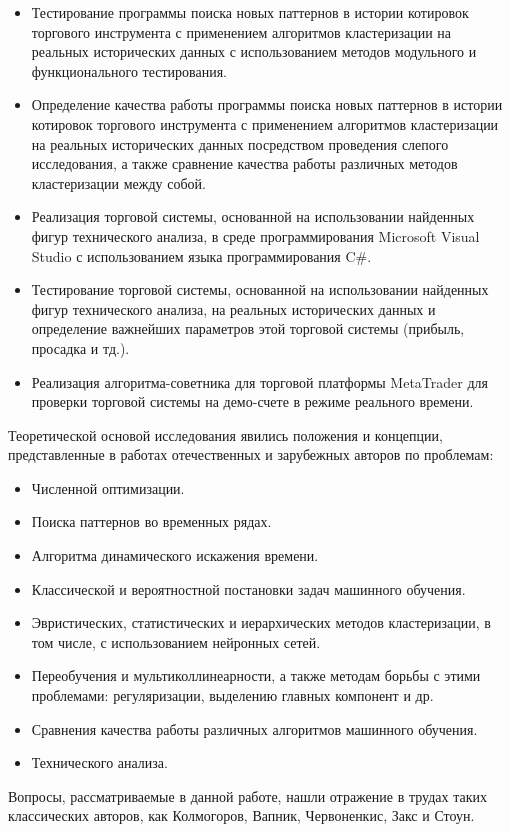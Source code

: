 \documentclass[12pt]{article}
\begin{document}
\begin{itemize}
\item Тестирование программы поиска новых паттернов в истории котировок торгового инструмента с применением алгоритмов кластеризации на реальных исторических данных с использованием методов модульного и функционального тестирования.
\item Определение качества работы программы поиска новых паттернов в истории котировок торгового инструмента с применением алгоритмов кластеризации на реальных исторических данных посредством проведения слепого исследования, а также сравнение качества работы различных методов кластеризации между собой.
\item Реализация торговой системы, основанной на использовании найденных фигур технического анализа, в среде программирования Microsoft Visual Studio с использованием языка программирования C\#.
\item Тестирование торговой системы, основанной на использовании найденных фигур технического анализа, на реальных исторических данных и определение важнейших параметров этой торговой системы (прибыль, просадка и тд.).
\item Реализация алгоритма-советника для торговой платформы MetaTrader для проверки
торговой системы на демо-счете в режиме реального времени.
\end{itemize}

Теоретической основой исследования явились положения и концепции, представленные в
работах отечественных и зарубежных авторов по проблемам:

\begin{itemize}
\item Численной оптимизации.
\item Поиска паттернов во временных рядах.
\item Алгоритма динамического искажения времени.
\item Классической и вероятностной постановки задач машинного обучения.
\item Эвристических, статистических и иерархических методов кластеризации, в том числе, с использованием нейронных сетей.
\item Переобучения и мультиколлинеарности, а также методам борьбы с этими проблемами:
регуляризации, выделению главных компонент и др.
\item Сравнения качества работы различных алгоритмов машинного обучения.
\item Технического анализа.
\end{itemize}

Вопросы, рассматриваемые в данной работе, нашли отражение в трудах таких классических авторов, как Колмогоров, Вапник, Червоненкис, Закс и Стоун.
\end{document}
